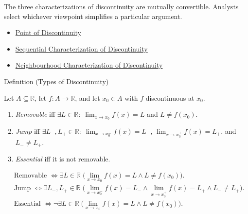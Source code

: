 \begin{remark*}[Interpretation]
The three characterizations of discontinuity are mutually convertible. Analysts select whichever viewpoint simplifies a particular argument.
\end{remark*}

\begin{dependencies}
\begin{itemize}
  \item \hyperref[def:point-of-discontinuity]{Point of Discontinuity}
  \item \hyperref[def:sequential-discontinuity-at-a-point]{Sequential Characterization of Discontinuity}
  \item \hyperref[def:neighborhood-discontinuity-at-a-point]{Neighbourhood Characterization of Discontinuity}
\end{itemize}
\end{dependencies}


\begin{definitionbox}{Definition (Types of Discontinuity)}
\begin{definition}
\label{def:types-of-discontinuity-at-a-point}
Let $A \subseteq \mathbb{R}$, let $f:A \to \mathbb{R}$, and let $x_0 \in A$ with $f$ discontinuous at $x_0$.
\begin{enumerate}[label=(\roman*)]
  \item \emph{Removable} iff $\exists L \in \mathbb{R}:\;\lim_{x \to x_0} f(x) = L$ and $L \ne f(x_0)$.
  \item \emph{Jump} iff $\exists L_{-}, L_{+} \in \mathbb{R}:\;\lim_{x \to x_0^-} f(x) = L_{-}$, $\lim_{x \to x_0^+} f(x) = L_{+}$, and $L_{-} \ne L_{+}$.
  \item \emph{Essential} iff it is not removable.
\end{enumerate}
\end{definition}
\end{definitionbox}

\begin{remark*}
\[
\begin{aligned}
&\text{Removable } \Longleftrightarrow \exists L \in \mathbb{R}\; \bigl(\lim_{x \to x_0} f(x) = L \land L \ne f(x_0)\bigr).\\
&\text{Jump } \Longleftrightarrow \exists L_{-}, L_{+} \in \mathbb{R}\; \bigl(\lim_{x \to x_0^-} f(x) = L_{-} \land \lim_{x \to x_0^+} f(x) = L_{+} \land L_{-} \ne L_{+}\bigr).\\
&\text{Essential } \Longleftrightarrow \neg \exists L \in \mathbb{R}\; \bigl(\lim_{x \to x_0} f(x) = L \land L \ne f(x_0)\bigr).
\end{aligned}
\]
\end{remark*}

